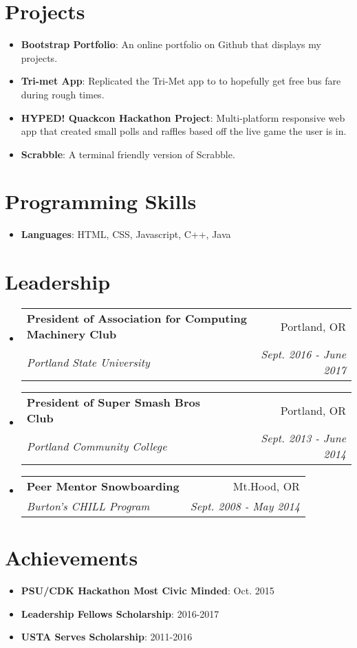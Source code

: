 \documentclass[letterpaper,11pt]{article}
\makeatletter
\newcommand{\resumeItem}[2]{
  \item\small{
    \textbf{#1}{: #2 \vspace{-2pt}}
  }
}
\newcommand{\resumeSubheading}[4]{
  \vspace{-1pt}\item
    \begin{tabular*}{0.97\textwidth}{l@{\extracolsep{\fill}}r}
      \textbf{#1} & #2 \\
      \textit{\small#3} & \textit{\small #4} \\
    \end{tabular*}\vspace{-5pt}
}
\newcommand{\resumeSubItem}[2]{\resumeItem{#1}{#2}\vspace{-4pt}}
\newcommand{\resumeSubHeadingListStart}{\begin{itemize}[leftmargin=*]}
\newcommand{\resumeSubHeadingListEnd}{\end{itemize}}
\makeatother
\begin{document}
\section{Projects}
  \resumeSubHeadingListStart
    \resumeSubItem{Bootstrap Portfolio}
        {An online portfolio on Github that displays my projects.}
    \resumeSubItem{Tri-met App}
        {Replicated the Tri-Met app to to hopefully get free bus fare during rough times.}
    \resumeSubItem{HYPED! Quackcon Hackathon Project}
         {Multi-platform responsive web app that created small polls and raffles based off the live game the user is in.}
    \resumeSubItem{Scrabble}
        {A terminal friendly version of Scrabble.}
  \resumeSubHeadingListEnd
%
\section{Programming Skills}
  \resumeSubHeadingListStart
    \item{
      \textbf{Languages}{: HTML, CSS, Javascript, C++, Java}
    }
  \resumeSubHeadingListEnd

\section{Leadership}
    \resumeSubHeadingListStart
        \resumeSubheading{President of Association for Computing Machinery Club}{Portland, OR}
        {Portland State University}{Sept. 2016 - June 2017}
    \resumeSubHeadingListEnd
    \resumeSubHeadingListStart
        \resumeSubheading{President of Super Smash Bros Club}{Portland, OR}
        {Portland Community College}{Sept. 2013 - June 2014}
    \resumeSubHeadingListEnd
    \resumeSubHeadingListStart
        \resumeSubheading{Peer Mentor Snowboarding}{Mt.Hood, OR}
        {Burton's CHILL Program}{Sept. 2008 - May 2014}
    \resumeSubHeadingListEnd
    
\section{Achievements}
    \resumeSubHeadingListStart
    \resumeItem{PSU/CDK Hackathon Most Civic Minded}{Oct. 2015}
    \resumeItem{Leadership Fellows Scholarship}{2016-2017}
    \resumeItem{USTA Serves Scholarship}{2011-2016}
    \resumeSubHeadingListEnd
\end{document}
